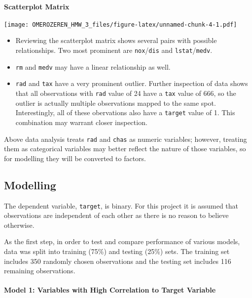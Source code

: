 \documentclass[]{article}
\providecommand{\tightlist}{%
  \setlength{\itemsep}{0pt}\setlength{\parskip}{0pt}}
\let\oldparagraph\paragraph
\renewcommand{\paragraph}[1]{\oldparagraph{#1}\mbox{}}
\begin{document}
\hypertarget{scatterplot-matrix}{%
\paragraph{Scatterplot Matrix}\label{scatterplot-matrix}}

\texttt{[image: OMEROZEREN\_HMW\_3\_files/figure-latex/unnamed-chunk-4-1.pdf]}

\begin{itemize}
\tightlist
\item
  Reviewing the scatterplot matrix shows several pairs with possible
  relationships. Two most prominent are \texttt{nox}/\texttt{dis} and
  \texttt{lstat}/\texttt{medv}.
\item
  \texttt{rm} and \texttt{medv} may have a linear relationship as well.
\item
  \texttt{rad} and \texttt{tax} have a very prominent outlier. Further
  inspection of data shows that all observations with \texttt{rad} value
  of 24 have a \texttt{tax} value of 666, so the outlier is actually
  multiple observations mapped to the same spot. Interestingly, all of
  these obervations also have a \texttt{target} value of 1. This
  combination may warrant closer inspection.
\end{itemize}

Above data analysis treats \texttt{rad} and \texttt{chas} as numeric
variables; however, treating them as categorical variables may better
reflect the nature of those variables, so for modelling they will be
converted to factors.

\hypertarget{modelling}{%
\subsection{Modelling}\label{modelling}}

The dependent variable, \texttt{target}, is binary. For this project it
is assumed that observations are independent of each other as there is
no reason to believe otherwise.

As the first step, in order to test and compare performance of various
models, data was split into training (75\%) and testing (25\%) sets. The
training set includes 350 randomly chosen observations and the testing
set includes 116 remaining observations.

\hypertarget{model-1-variables-with-high-correlation-to-target-variable}{%
\paragraph{Model 1: Variables with High Correlation to Target
Variable}\label{model-1-variables-with-high-correlation-to-target-variable}}
\end{document}
